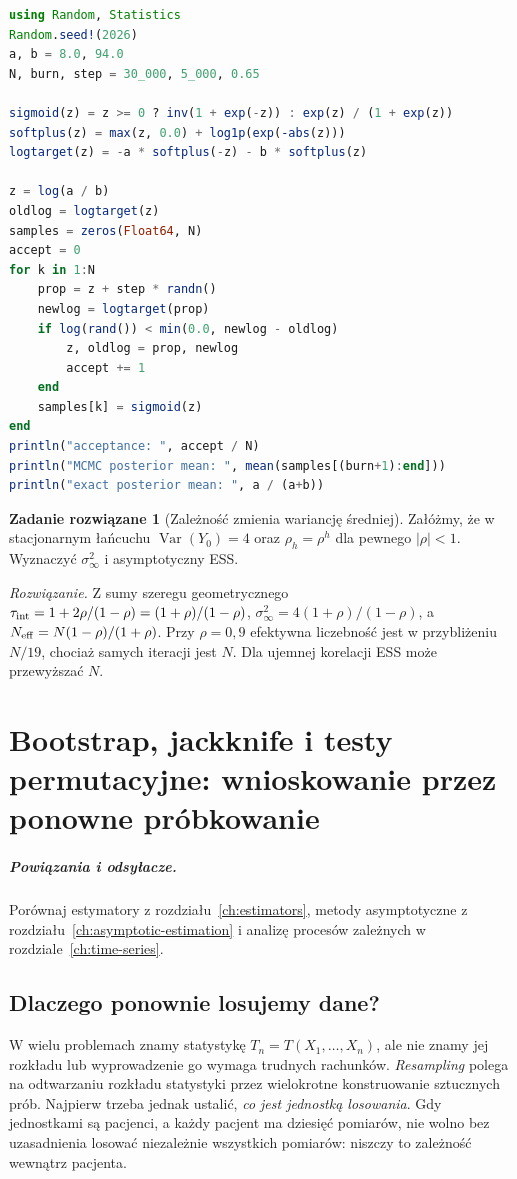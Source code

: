 \documentclass[11pt,a4paper,oneside]{report}
\numberwithin{equation}{chapter}
\theoremstyle{plain}
\theoremstyle{definition}
\newtheorem{zadanie}{Zadanie rozwiązane}[chapter]
\theoremstyle{remark}
\newcommand{\Var}{\operatorname{Var}}
\begin{document}
\begin{lstlisting}[language=Julia,caption={Kompletny program: random-walk Metropolis dla posterioru beta we współrzędnej logit (Julia, Random i Statistics).}]
using Random, Statistics
Random.seed!(2026)
a, b = 8.0, 94.0
N, burn, step = 30_000, 5_000, 0.65

sigmoid(z) = z >= 0 ? inv(1 + exp(-z)) : exp(z) / (1 + exp(z))
softplus(z) = max(z, 0.0) + log1p(exp(-abs(z)))
logtarget(z) = -a * softplus(-z) - b * softplus(z)

z = log(a / b)
oldlog = logtarget(z)
samples = zeros(Float64, N)
accept = 0
for k in 1:N
    prop = z + step * randn()
    newlog = logtarget(prop)
    if log(rand()) < min(0.0, newlog - oldlog)
        z, oldlog = prop, newlog
        accept += 1
    end
    samples[k] = sigmoid(z)
end
println("acceptance: ", accept / N)
println("MCMC posterior mean: ", mean(samples[(burn+1):end]))
println("exact posterior mean: ", a / (a+b))
\end{lstlisting}

\begin{zadanie}[Zależność zmienia wariancję średniej]
Załóżmy, że w stacjonarnym łańcuchu $\Var(Y_0)=4$ oraz
$\rho_h=\rho^h$ dla pewnego $|\rho|<1$.
Wyznaczyć $\sigma_\infty^2$ i asymptotyczny ESS.
\par\emph{Rozwiązanie.} Z sumy szeregu geometrycznego
$\tau_{\rm int}=1+2\rho/(1-\rho)=(1+\rho)/(1-\rho)$,
$\sigma_\infty^2=4(1+\rho)/(1-\rho)$, a
$N_{\rm eff}=N(1-\rho)/(1+\rho)$.
Przy $\rho=0{,}9$ efektywna liczebność jest w przybliżeniu
$N/19$, chociaż samych iteracji jest $N$.
Dla ujemnej korelacji ESS może przewyższać $N$.
\end{zadanie}

\chapter{Bootstrap, jackknife i testy permutacyjne: wnioskowanie przez ponowne próbkowanie}
\label{ch:resampling}
\paragraph{Powiązania i odsyłacze.} Porównaj estymatory z rozdziału~\ref{ch:estimators}, metody asymptotyczne z rozdziału~\ref{ch:asymptotic-estimation} i analizę procesów zależnych w rozdziale~\ref{ch:time-series}.


\section{Dlaczego ponownie losujemy dane?}
W wielu problemach znamy statystykę $T_n=T(X_1,\ldots,X_n)$,
ale nie znamy jej rozkładu lub wyprowadzenie go wymaga trudnych
rachunków. \emph{Resampling} polega na odtwarzaniu rozkładu
statystyki przez wielokrotne konstruowanie sztucznych prób.
Najpierw trzeba jednak ustalić, \emph{co jest jednostką losowania}.
Gdy jednostkami są pacjenci, a każdy pacjent ma dziesięć pomiarów,
nie wolno bez uzasadnienia losować niezależnie wszystkich pomiarów:
niszczy to zależność wewnątrz pacjenta.
\end{document}
